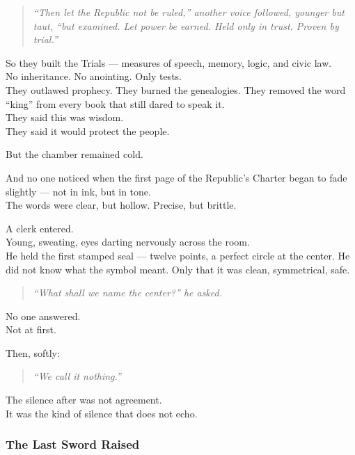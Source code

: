 \documentclass[12pt]{article}
\begin{document}
\begin{quote}
\textit{“Then let the Republic not be ruled,” another voice followed, younger but taut, “but examined. Let power be earned. Held only in trust. Proven by trial.”}
\end{quote}

So they built the Trials --- measures of speech, memory, logic, and civic law.\\
No inheritance. No anointing. Only tests.\\

They outlawed prophecy. 
They burned the genealogies.
They removed the word “king” from every book that still dared to speak it.\\

They said this was wisdom.\\
They said it would protect the people.

But the chamber remained cold.

And no one noticed when the first page of the Republic’s Charter began to fade slightly --- not in ink, but in tone.\\
The words were clear, but hollow. Precise, but brittle.

\vspace{1em}

A clerk entered.\\
Young, sweating, eyes darting nervously across the room.\\
He held the first stamped seal --- twelve points, a perfect circle at the center. He did not know what the symbol meant. Only that it was clean, symmetrical, safe.

\begin{quote}
\textit{“What shall we name the center?” he asked.}
\end{quote}

No one answered.\\
Not at first.

Then, softly:

\begin{quote}
\textit{“We call it nothing.”}
\end{quote}

The silence after was not agreement.\\
It was the kind of silence that does not echo.

\dotfill

\subsubsection{The Last Sword Raised}
\end{document}
